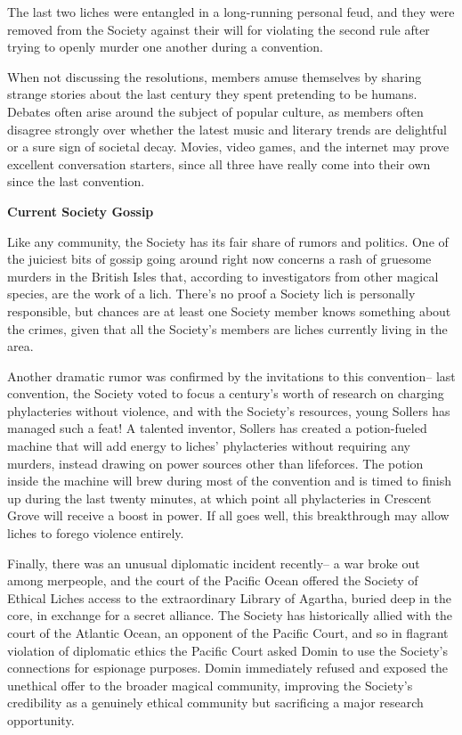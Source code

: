 \documentclass[blue]{Sel}
\begin{document}
The last two liches were entangled in a long-running personal feud, and they were removed from the Society against their will for violating the second rule after trying to openly murder one another during a convention.

When not discussing the resolutions, members amuse themselves by sharing strange stories about the last century they spent pretending to be humans. Debates often arise around the subject of popular culture, as members often disagree strongly over whether the latest music and literary trends are delightful or a sure sign of societal decay. Movies, video games, and the internet may prove excellent conversation starters, since all three have really come into their own since the last convention.

\textbf{Current Society Gossip}

Like any community, the Society has its fair share of rumors and politics. One of the juiciest bits of gossip going around right now concerns a rash of gruesome murders in the British Isles that, according to investigators from other magical species, are the work of a lich. There's no proof a Society lich is personally responsible, but chances are at least one Society member knows something about the crimes, given that all the Society's members are liches currently living in the area.

Another dramatic rumor was confirmed by the invitations to this convention-- last convention, the Society voted to focus a century's worth of research on charging phylacteries without violence, and with the Society's resources, young Sollers has managed such a feat! A talented inventor, Sollers has created a potion-fueled machine that will add energy to liches' phylacteries without requiring any murders, instead drawing on power sources other than lifeforces. The potion inside the machine will brew during most of the convention and is timed to finish up during the last twenty minutes, at which point all phylacteries in Crescent Grove will receive a boost in power. If all goes well, this breakthrough may allow liches to forego violence entirely.

Finally, there was an unusual diplomatic incident recently-- a war broke out among merpeople, and the court of the Pacific Ocean offered the Society of Ethical Liches access to the extraordinary Library of Agartha, buried deep in the core, in exchange for a secret alliance. The Society has historically allied with the court of the Atlantic Ocean, an opponent of the Pacific Court, and so in flagrant violation of diplomatic ethics the Pacific Court asked Domin to use the Society's connections for espionage purposes. Domin immediately refused and exposed the unethical offer to the broader magical community, improving the Society's credibility as a genuinely ethical community but sacrificing a major research opportunity.
\end{document}
